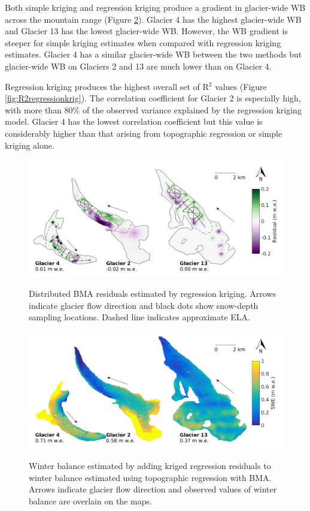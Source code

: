 \documentclass{sfuthesis}
\newcommand{\topomap}{Arrows indicate glacier flow direction and black dots show snow-depth sampling locations. }
\newcommand{\swedots}{Arrows indicate glacier flow direction and observed values of winter balance are overlain on the maps. }
\begin{document}
Both simple kriging and regression kriging produce a gradient in glacier-wide WB across the mountain range (Figure \ref{fig:Regression-Kriging}). Glacier 4 has the highest glacier-wide WB and Glacier 13 has the lowest glacier-wide WB. However, the WB gradient is steeper for simple kriging estimates when compared with regression kriging estimates. Glacier 4 has a similar glacier-wide WB between the two methods but glacier-wide WB on Glaciers 2 and 13 are much lower than on Glacier 4.  

Regression kriging produces the highest overall set of R$^2$ values (Figure \ref{fig:R2regressionkrig}). The correlation coefficient for Glacier 2 is especially high, with more than 80\% of the observed variance explained by the regression kriging model. Glacier 4 has the lowest correlation coefficient but this value is considerably higher than that arising from topographic regression or simple kriging alone. 

\begin{figure}[H]
	\centering
	\includegraphics[width = \textwidth]{residualsKriged.png}\\
	\caption[Distributed BMA residuals estimated by regression kriging]{Distributed BMA residuals estimated by regression kriging. \topomap Dashed line indicates approximate ELA.}
	\label{fig:residualsKRIGING}
\end{figure}

\begin{figure}[H]
	\centering
	\includegraphics[width = \textwidth]{RegressionKriging.png}\\
	\caption[Winter balance estimated by adding kriged regression residuals to winter balance estimated using topographic regression with BMA]{Winter balance estimated by adding kriged regression residuals to winter balance estimated using topographic regression with BMA. \swedots}
	\label{fig:Regression-Kriging}
\end{figure}
\end{document}
